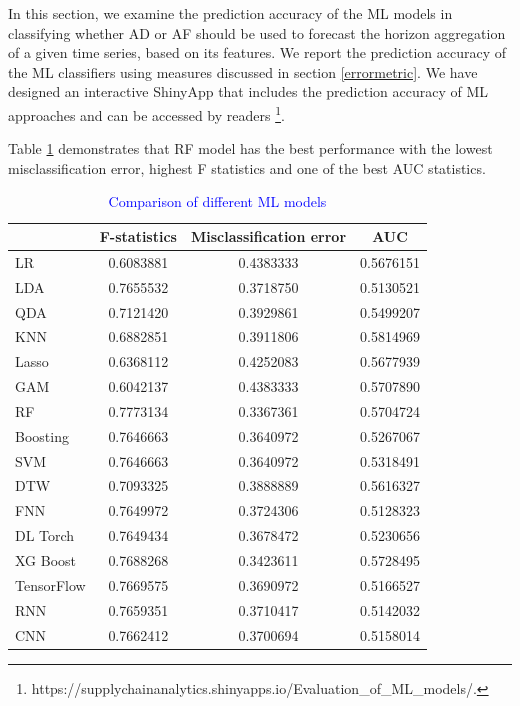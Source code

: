 \documentclass[preprint, 3p,
authoryear]{elsarticle} %
\begin{document}
In this section, we examine the prediction accuracy of the ML models in
classifying whether AD or AF should be used to forecast the horizon
aggregation of a given time series, based on its features. We report the
prediction accuracy of the ML classifiers using measures discussed in
section \ref{errormetric}. We have designed an interactive ShinyApp that
includes the prediction accuracy of ML approaches and can be accessed by
readers \footnote{https://supplychainanalytics.shinyapps.io/Evaluation\_of\_ML\_models/.}.

Table \ref{tab:cost} demonstrates that RF model has the best performance
with the lowest misclassification error, highest F statistics and one of
the best AUC statistics.

\begin{table}
\caption{\label{tab:cost}\textcolor{blue}{Comparison of different ML models}}
\centering
\begin{tabular}[t]{lccc}
\hline
 & F-statistics & Misclassification error & AUC\\
\hline
LR &  0.6083881 &  0.4383333 & 0.5676151\\
\hline
LDA & 0.7655532 & 0.3718750 & 0.5130521\\
\hline
QDA &  0.7121420 & 0.3929861 & 0.5499207\\
\hline
KNN &  0.6882851 & 0.3911806 & 0.5814969\\
\hline
Lasso & 0.6368112 & 0.4252083 & 0.5677939\\
\hline
GAM &  0.6042137 & 0.4383333 & 0.5707890\\
\hline
RF & 0.7773134 & 0.3367361 & 0.5704724\\
\hline
Boosting & 0.7646663 & 0.3640972 & 0.5267067\\
\hline
SVM & 0.7646663 & 0.3640972 & 0.5318491\\
\hline
DTW & 0.7093325 & 0.3888889 & 0.5616327\\
\hline
FNN & 0.7649972 & 0.3724306 & 0.5128323\\
\hline
DL Torch & 0.7649434 & 0.3678472 & 0.5230656\\
\hline
XG Boost & 0.7688268 & 0.3423611 & 0.5728495\\
\hline
TensorFlow & 0.7669575 & 0.3690972 & 0.5166527\\
\hline
RNN & 0.7659351 & 0.3710417 & 0.5142032\\
\hline
CNN & 0.7662412 & 0.3700694 & 0.5158014\\
\hline
\end{tabular}
\end{table}
\end{document}
